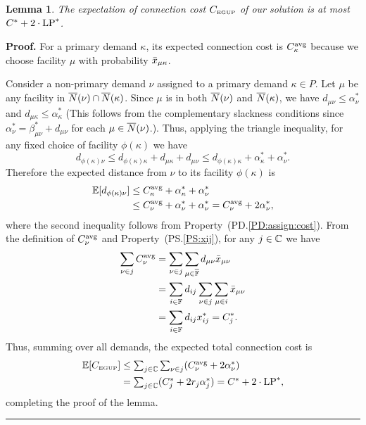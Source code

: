 \documentclass[oneside,final]{ucr}
\newtheorem{lemma}[theorem]{Lemma}
\newenvironment{proof}[1][Proof]{\textbf{#1.} }{\ \rule{0.5em}{0.5em}}
\begin{document}

\begin{lemma}\label{lemma:3dist}
The expectation of connection cost $C_{\mbox{\tiny\rm EGUP}}$ of our solution
is at most  $C^\ast+2\cdot\mbox{\rm LP}^\ast$.
\end{lemma}

\begin{proof}
  For a primary demand $\kappa$, its expected connection cost is
  $C_{\kappa}^{{\mbox{\scriptsize\rm avg}}}$ because we choose facility $\mu$ with
  probability ${\bar x}_{\mu\kappa}$.

  Consider a non-primary demand $\nu$ assigned to a primary demand
  $\kappa\in P$. Let $\mu$ be any facility in ${\overline{N}}(\nu) \cap
  {\overline{N}}(\kappa)$.  Since $\mu$ is in both ${\overline{N}}(\nu)$ and
  ${\overline{N}}(\kappa)$, we have $d_{\mu\nu} \leq \alpha_{\nu}^\ast$ and
  $d_{\mu\kappa} \leq \alpha_{\kappa}^\ast$ (This follows from the
  complementary slackness conditions since
  $\alpha_{\nu}^\ast=\beta_{\mu\nu}^\ast + d_{\mu\nu}$ for each
  $\mu\in {\overline{N}}(\nu)$.). Thus, applying the triangle inequality, for
  any fixed choice of facility $\phi(\kappa)$ we have
%
\begin{equation*}
    d_{\phi(\kappa)\nu} \leq d_{\phi(\kappa)\kappa}+d_{\mu\kappa}+d_{\mu\nu}
    \leq d_{\phi(\kappa)\kappa} + \alpha_{\kappa}^\ast + \alpha_{\nu}^\ast.
\end{equation*}
%
Therefore the expected distance from $\nu$ to its facility $\phi(\kappa)$ is 
%
\begin{align*}
  \mathbb{E}[  d_{\phi(\kappa)\nu}   ] &\le C^{{\mbox{\scriptsize\rm avg}}}_{\kappa} + \alpha_{\kappa}^\ast + \alpha_{\nu}^\ast 
\\
  &\leq C^{{\mbox{\scriptsize\rm avg}}}_{\nu} + \alpha_{\nu}^\ast + \alpha_{\nu}^\ast
   = C^{{\mbox{\scriptsize\rm avg}}}_{\nu} + 2\alpha_{\nu}^\ast,
  \end{align*}
%
  where the second inequality follows from Property~(PD.\ref{PD:assign:cost}).  
From the definition of $C^{{\mbox{\scriptsize\rm avg}}}_{\nu}$ and Property~(PS.\ref{PS:xij}), for any $j\in \mathbb{C}$ 
we have
%
\begin{align*}
\sum_{\nu\in j} C^{{\mbox{\scriptsize\rm avg}}}_{\nu} &= \sum_{\nu\in j}\sum_{\mu\in\overline{\mathbb{F}}}d_{\mu\nu}{\bar x}_{\mu\nu}
			\\
 			&= \sum_{i\in\mathbb{F}} d_{ij}\sum_{\nu\in j}\sum_{\mu\in i}{\bar x}_{\mu\nu}
			\\
			&= \sum_{i\in\mathbb{F}} d_{ij}x^\ast_{ij} 
			= C^\ast_j.
\end{align*}
% 
Thus, summing over all demands, the expected total connection cost is
%
\begin{align*}
    \mathbb{E}[C_{\mbox{\tiny\rm EGUP}}] &\le 
			\textstyle{\sum_{j\in\mathbb{C}} \sum_{\nu\in j}} (C^{{\mbox{\scriptsize\rm avg}}}_{\nu} + 2\alpha_{\nu}^\ast) 
			\\
    	& = \textstyle{\sum_{j\in\mathbb{C}}} (C_j^\ast + 2r_j\alpha_j^\ast)
 		= C^\ast + 2\cdot\mbox{\rm LP}^\ast,
\end{align*}
%
completing the proof of the lemma.
\end{proof}
\end{document}
